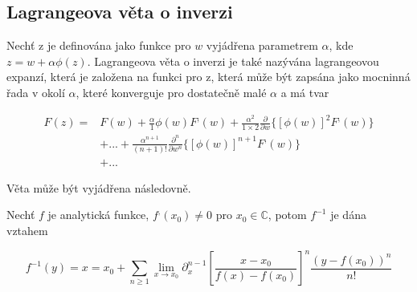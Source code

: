 \subsection{Lagrangeova věta o inverzi}

Nechť z je definována jako funkce pro \(w\) vyjádřena parametrem 
\(\alpha\), kde \(z = w + \alpha \phi(z)\). Lagrangeova věta o 
inverzi je také nazývána lagrangeovou expanzí, která je založena 
na funkci pro z, která může být zapsána jako mocninná řada v okolí
\(\alpha\), které konverguje pro dostatečně malé \(\alpha\) a má tvar

\begin{align}
      F(z) =& F(w) + \frac{\alpha}{1}\phi(w)F^,(w) + \frac{\alpha^2}{1
      \times 2}\frac{\partial}{\partial w}\{[\phi(w)]^2F^,(w)\} \\
      & + ... + \frac{\alpha^{n+1}}{(n+1)!}\frac{\partial^n}{\partial
      w^n}\{[\phi(w)]^{n+1}F^,(w)\} \\
      & + ...
\end{align}


Věta může být vyjádřena následovně.

\begin{theorem}
      Nechť \(f\) je analytická funkce, \(f^,(x_0) \neq 0\) pro 
      \(x_0 \in \mathbb{C}\), potom \(f^{-1}\) je dána vztahem
      
      \begin{equation}
            f^{-1}(y) = x = x_0 + \sum_{n \geq 1}\lim_{x \to x_0}
            \partial_x^{n-1}\left[ \frac{x - x_0}{f(x) - f(x_0)}\right]^n
            \frac{(y-f(x_0))^n}{n!}
      \end{equation}
      \label{A}
\end{theorem}

